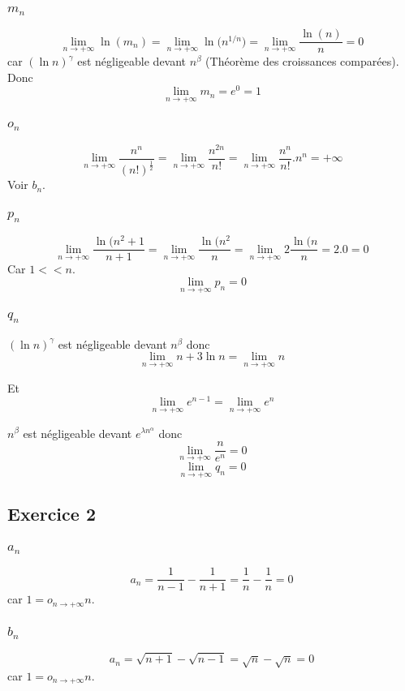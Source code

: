 \documentclass[]{book}
\theoremstyle{definition}
\begin{document}
\subsubsection*{$m_n$}
$$\lim_{n \to +\infty}{\ln(m_n)} = \lim_{n \to +\infty}{\ln(n^{1/n}}) = \lim_{n \to +\infty}{\frac{\ln(n)}{n}} = 0$$
car $(\ln n)^{\gamma}$ est n\'egligeable devant $n^{\beta}$ (Th\'eor\`eme des croissances compar\'ees). Donc
$$\lim_{n \to +\infty}{m_n} = e^0 = 1$$
 

\subsubsection*{$o_n$}
$$\lim_{n \to +\infty}{\frac{n^n}{(n!)^{\frac{1}{2}}}} = \lim_{n \to +\infty}{\frac{n^{2n}}{n!}} = \lim_{n \to +\infty}{\frac{n^n}{n!}.n^n} = +\infty$$
Voir $b_n$.

\subsubsection*{$p_n$}
$$\lim_{n \to +\infty}{\frac{\ln(n^2+1}{n+1}} = \lim_{n \to +\infty}{\frac{\ln(n^2}{n}} = \lim_{n \to +\infty}{2\frac{\ln(n}{n}} = 2.0 = 0$$
Car $1 << n$.
$$\lim_{n \to +\infty}{p_n} = 0$$

\subsubsection*{$q_n$}
$(\ln n)^{\gamma}$ est n\'egligeable devant $n^{\beta}$ donc
$$\lim_{n \to +\infty}{n + 3\ln n} = \lim_{n \to +\infty}{n}$$

Et
$$\lim_{n \to +\infty}{e^{n-1}} = \lim_{n \to +\infty}{e^{n}}$$

$n^{\beta}$ est n\'egligeable devant $e^{\lambda n^{\alpha}}$ donc
$$\lim_{n \to +\infty}{\frac{n}{e^{n}}} = 0$$
$$\lim_{n \to +\infty}{q_n} = 0$$


\subsection*{Exercice 2}
\subsubsection*{$a_n$}
$$a_n = \frac{1}{n-1}-\frac{1}{n+1} = \frac{1}{n}-\frac{1}{n} = 0$$
car $1 = o_{n \to +\infty}n$.

\subsubsection*{$b_n$}
$$a_n = \sqrt{n+1}-\sqrt{n-1} = \sqrt{n}-\sqrt{n} = 0$$
car $1 = o_{n \to +\infty}n$.
\end{document}
